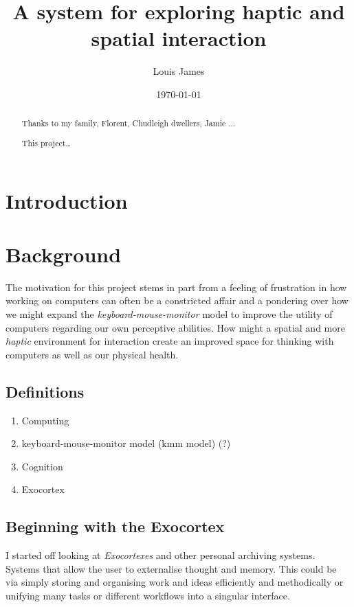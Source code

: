 \documentclass[12pt]{report}
\author{Louis James}
\date{\today}
\title{A system for exploring haptic and spatial interaction}
\begin{document}
\maketitle


\renewcommand{\abstractname}{Acknowledgements}
\begin{abstract}
 Thanks to my family, Florent, Chudleigh dwellers, Jamie ...
\end{abstract}
\newpage
\renewcommand{\abstractname}{Abstract}
\begin{abstract}
This project\ldots{}
\end{abstract}
\tableofcontents
\listoffigures
\chapter{Introduction}
\label{sec:orgea35e9f}
\chapter{Background}
\label{sec:org96f72a8}

The motivation for this project stems in part from a feeling of frustration in
how working on computers can often be a constricted affair and a pondering over
how we might expand the \emph{keyboard-mouse-monitor} model to improve the utility of
computers regarding our own perceptive abilities. How might a spatial and more
\emph{haptic} environment for interaction create an improved space for thinking with
computers as well as our physical health.

\section{Definitions}
\label{sec:org2af3ec0}
\begin{enumerate}
\item Computing
\label{sec:org3d867a2}
\item keyboard-mouse-monitor model (kmm model) (?)
\label{sec:org45210ef}
\item Cognition
\label{sec:org214fa66}
\item Exocortex
\label{sec:org07f9845}
\end{enumerate}

\section{Beginning with the Exocortex}
\label{sec:org33257ea}

I started off looking at \emph{Exocortexes} and other personal archiving systems.
Systems that allow the user to externalise thought and memory. This could be via
simply storing and organising work and ideas efficiently and methodically or
unifying many tasks or different workflows into a singular interface. \\
\end{document}

